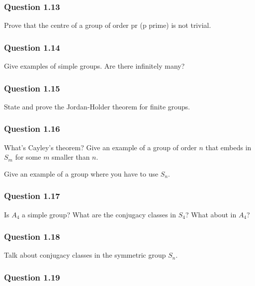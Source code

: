 \hypertarget{question-1.13}{%
\subsubsection{Question 1.13}\label{question-1.13}}

Prove that the centre of a group of order pr (p prime) is not trivial.

\hypertarget{question-1.14}{%
\subsubsection{Question 1.14}\label{question-1.14}}

Give examples of simple groups. Are there infinitely many?

\hypertarget{question-1.15}{%
\subsubsection{Question 1.15}\label{question-1.15}}

State and prove the Jordan-Holder theorem for finite groups.

\hypertarget{question-1.16}{%
\subsubsection{Question 1.16}\label{question-1.16}}

What's Cayley's theorem? Give an example of a group of order \(n\) that
embeds in \(S_m\) for some \(m\) smaller than \(n\).

Give an example of a group where you have to use \(S_n\).

\hypertarget{question-1.17}{%
\subsubsection{Question 1.17}\label{question-1.17}}

Is \(A_4\) a simple group? What are the conjugacy classes in \(S_4\)?
What about in \(A_4\)?

\hypertarget{question-1.18}{%
\subsubsection{Question 1.18}\label{question-1.18}}

Talk about conjugacy classes in the symmetric group \(S_n\).

\hypertarget{question-1.19}{%
\subsubsection{Question 1.19}\label{question-1.19}}

